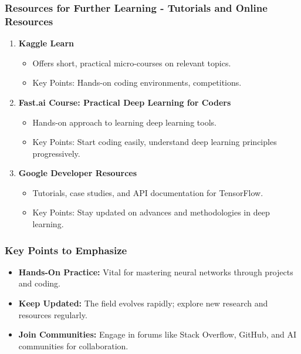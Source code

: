 \documentclass[aspectratio=169]{beamer}
\begin{document}
\begin{frame}[fragile]
    \frametitle{Resources for Further Learning - Tutorials and Online Resources}
    \begin{enumerate}
        \item \textbf{Kaggle Learn}
        \begin{itemize}
            \item Offers short, practical micro-courses on relevant topics.
            \item Key Points: Hands-on coding environments, competitions.
        \end{itemize}
        
        \item \textbf{Fast.ai Course: Practical Deep Learning for Coders}
        \begin{itemize}
            \item Hands-on approach to learning deep learning tools.
            \item Key Points: Start coding easily, understand deep learning principles progressively.
        \end{itemize}
        
        \item \textbf{Google Developer Resources}
        \begin{itemize}
            \item Tutorials, case studies, and API documentation for TensorFlow.
            \item Key Points: Stay updated on advances and methodologies in deep learning.
        \end{itemize}
    \end{enumerate}
\end{frame}

\begin{frame}[fragile]
    \frametitle{Key Points to Emphasize}
    \begin{itemize}
        \item \textbf{Hands-On Practice:} Vital for mastering neural networks through projects and coding.
        \item \textbf{Keep Updated:} The field evolves rapidly; explore new research and resources regularly.
        \item \textbf{Join Communities:} Engage in forums like Stack Overflow, GitHub, and AI communities for collaboration.
    \end{itemize}
\end{frame}
\end{document}
